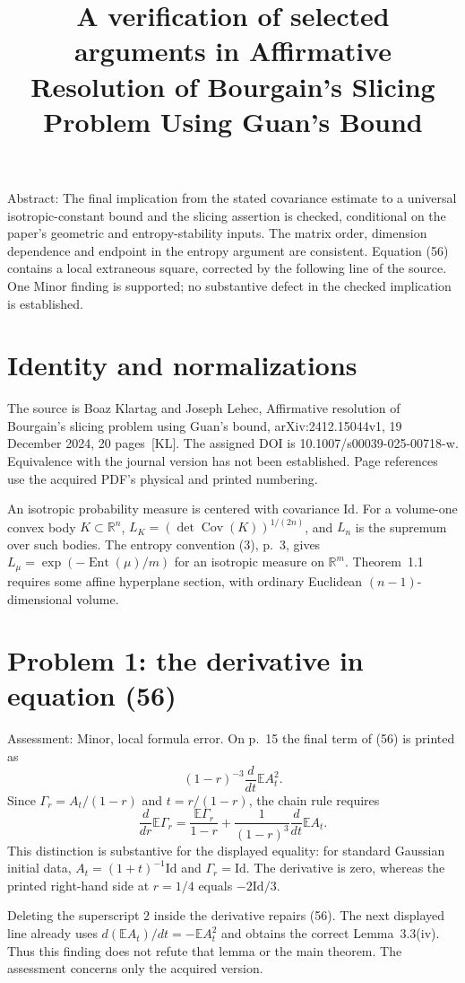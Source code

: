 \documentclass[10pt]{article}
\title{A verification of selected arguments in
Affirmative Resolution of Bourgain’s Slicing Problem
Using Guan’s Bound}
\author{}
\date{}
\begin{document}
\maketitle
Abstract: The final implication from the stated covariance estimate to a universal isotropic-constant bound and the slicing assertion is checked, conditional on the paper’s geometric and entropy-stability inputs. The matrix order, dimension dependence and endpoint in the entropy argument are consistent. Equation (56) contains a local extraneous square, corrected by the following line of the source. One Minor finding is supported; no substantive defect in the checked implication is established.\par
\section*{Identity and normalizations}
The source is Boaz Klartag and Joseph Lehec, Affirmative resolution of Bourgain’s slicing problem using Guan’s bound, arXiv:2412.15044v1, 19 December 2024, 20 pages [KL]. The assigned DOI is 10.1007/s00039-025-00718-w. Equivalence with the journal version has not been established. Page references use the acquired PDF’s physical and printed numbering.\par
An isotropic probability measure is centered with covariance \(\mathrm{Id}\). For a volume-one convex body \(K\subset\mathbb R^n\), \(L_K=(\det\operatorname{Cov}(K))^{1/(2n)}\), and \(L_n\) is the supremum over such bodies. The entropy convention (3), p. 3, gives \(L_\mu=\exp(-\operatorname{Ent}(\mu)/m)\) for an isotropic measure on \(\mathbb R^m\). Theorem 1.1 requires some affine hyperplane section, with ordinary Euclidean \((n-1)\)-dimensional volume.\par
\section*{Problem 1: the derivative in equation (56)}
Assessment: Minor, local formula error. On p. 15 the final term of (56) is printed as \[(1-r)^{-3}\frac{d}{dt}\mathbb EA_t^2 .\] Since \(\Gamma_r=A_t/(1-r)\) and \(t=r/(1-r)\), the chain rule requires \[\frac{d}{dr}\mathbb E\Gamma_r
 =\frac{\mathbb E\Gamma_r}{1-r}
  +\frac{1}{(1-r)^3}\frac{d}{dt}\mathbb EA_t .\] This distinction is substantive for the displayed equality: for standard Gaussian initial data, \(A_t=(1+t)^{-1}\mathrm{Id}\) and \(\Gamma_r=\mathrm{Id}\). The derivative is zero, whereas the printed right-hand side at \(r=1/4\) equals \(-2\mathrm{Id}/3\).\par
Deleting the superscript \(2\) inside the derivative repairs (56). The next displayed line already uses \(d(\mathbb EA_t)/dt=-\mathbb EA_t^2\) and obtains the correct Lemma 3.3(iv). Thus this finding does not refute that lemma or the main theorem. The assessment concerns only the acquired version.\par
\end{document}
